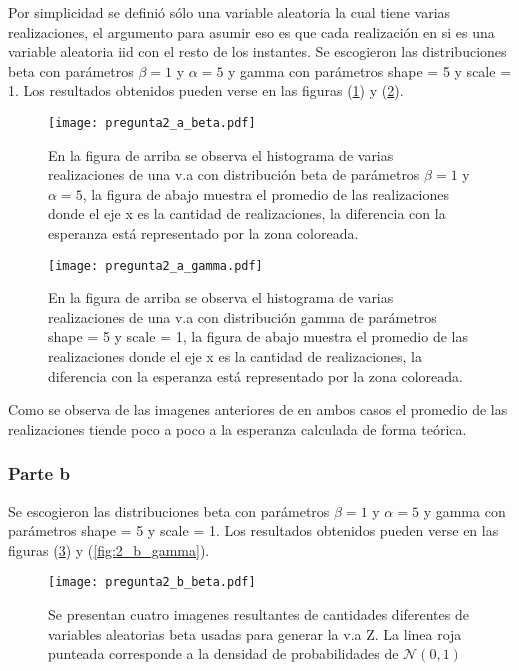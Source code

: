			Por simplicidad se definió sólo una variable aleatoria la cual tiene varias realizaciones, el argumento para asumir eso es que cada realización en si es una variable aleatoria iid con el resto de los instantes. Se escogieron las distribuciones beta con parámetros $\beta = 1$ y $\alpha = 5$ y gamma con parámetros shape = 5 y scale = 1. Los resultados obtenidos pueden verse en las figuras (\ref{fig:2_a_beta}) y (\ref{fig:2_a_gamma}).

			\begin{figure}[H]
			    \centering
			    \texttt{[image: pregunta2\_a\_beta.pdf]}
			    \caption{En la figura de arriba se observa el histograma de varias realizaciones de una v.a con distribución beta de parámetros $\beta = 1$ y $\alpha = 5$, la figura de abajo muestra el promedio de las realizaciones donde el eje x es la cantidad de realizaciones, la diferencia con la esperanza está representado por la zona coloreada.}
			    \label{fig:2_a_beta}
			\end{figure}

			\begin{figure}[H]
			    \centering
			    \texttt{[image: pregunta2\_a\_gamma.pdf]}
			    \caption{En la figura de arriba se observa el histograma de varias realizaciones de una v.a con distribución gamma de parámetros shape = 5 y scale = 1, la figura de abajo muestra el promedio de las realizaciones donde el eje x es la cantidad de realizaciones, la diferencia con la esperanza está representado por la zona coloreada.}
			    \label{fig:2_a_gamma}
			\end{figure}

			Como se observa de las imagenes anteriores de en ambos casos el promedio de las realizaciones tiende poco a poco a la esperanza calculada de forma teórica.



		\subsubsection {Parte b}
			Se escogieron las distribuciones beta con parámetros $\beta = 1$ y $\alpha = 5$ y gamma con parámetros shape = 5 y scale = 1. Los resultados obtenidos pueden verse en las figuras (\ref{fig:2_b_beta}) y (\ref{fig:2_b_gamma}).

			\begin{figure}[H]
			    \centering
			    \texttt{[image: pregunta2\_b\_beta.pdf]}
			    \caption{Se presentan cuatro imagenes resultantes de cantidades diferentes de variables aleatorias beta usadas para generar la v.a Z. La linea roja punteada corresponde a la densidad de probabilidades de $\mathcal{ N } (0, 1)$}
			    \label{fig:2_b_beta}
			\end{figure}

